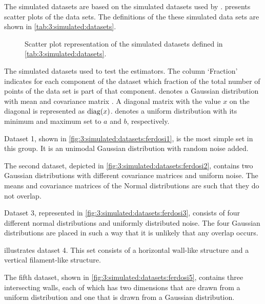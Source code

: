 
The simulated datasets are based on the simulated datasets used by \textcite{ferdosi2011comparison}.  presents scatter plots of the data sets. The definitions of the these simulated data sets are shown in \cref{tab:3:simulated:datasets}.

\begin{figure*}
	\centering
				
	\caption{Scatter plot representation of the simulated datasets defined in \cref{tab:3:simulated:datasets}. }
	\label{fig:3:simulated:datasets}
\end{figure*}

\begin{table*}
	\centering
	
	\caption{The simulated datasets used to test the estimators. The column `Fraction' indicates for each component of the dataset which fraction of the total number of points of the data set is part of that component. \gaussDist{\varMean}{\varCovarianceMatrix} denotes a Gaussian distribution with mean \varMean and covariance matrix \varCovarianceMatrix. A diagonal matrix with the value $x$ on the diagonal is represented as $\operatorname{diag}(x)$.  denotes a uniform distribution with its minimum and maximum set to $a$ and $b$, respectively.} 	
	\label{tab:3:simulated:datasets}
\end{table*}

	Dataset 1, shown in \cref{fig:3:simulated:datasets:ferdosi1}, is the most simple set in this group. It is an unimodal Gaussian distribution with random noise added. 

	The second dataset, depicted in \cref{fig:3:simulated:datasets:ferdosi2}, contains two Gaussian distributions with different covariance matrices and uniform noise. The means and covariance matrices of the Normal distributions are such that they do not overlap. 

	Dataset 3, represented in \cref{fig:3:simulated:datasets:ferdosi3}, consists of four different normal distributions and uniformly distributed noise. The four Gaussian distributions are placed in such a way that it is unlikely that any overlap occurs.

	 illustrates dataset 4. This set consists of a horizontal wall-like structure and a vertical filament-like structure. 

	The fifth dataset, shown in \cref{fig:3:simulated:datasets:ferdosi5}, contains three intersecting walls, each of which has two dimensions that are drawn from a uniform distribution and one that is drawn from a Gaussian distribution.


